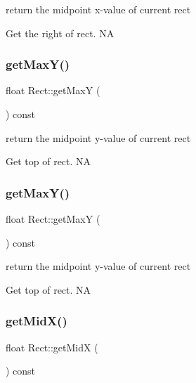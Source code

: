 return the midpoint x-\/value of current rect 

Get the right of rect.  NA \mbox{\label{classRect_ae508fa245f49f5cc691d2dc36fdd7a8c}} 
\subsubsection{\texorpdfstring{get\+Max\+Y()}{getMaxY()}\hspace{0.1cm}{\footnotesize\ttfamily [1/2]}}
{\footnotesize\ttfamily float Rect\+::get\+MaxY (\begin{DoxyParamCaption}{ }\end{DoxyParamCaption}) const}



return the midpoint y-\/value of current rect 

Get top of rect.  NA \mbox{\label{classRect_ae508fa245f49f5cc691d2dc36fdd7a8c}} 
\subsubsection{\texorpdfstring{get\+Max\+Y()}{getMaxY()}\hspace{0.1cm}{\footnotesize\ttfamily [2/2]}}
{\footnotesize\ttfamily float Rect\+::get\+MaxY (\begin{DoxyParamCaption}{ }\end{DoxyParamCaption}) const}



return the midpoint y-\/value of current rect 

Get top of rect.  NA \mbox{\label{classRect_a0d644f512a90863b28d73c445113702b}} 
\subsubsection{\texorpdfstring{get\+Mid\+X()}{getMidX()}\hspace{0.1cm}{\footnotesize\ttfamily [1/2]}}
{\footnotesize\ttfamily float Rect\+::get\+MidX (\begin{DoxyParamCaption}{ }\end{DoxyParamCaption}) const}



